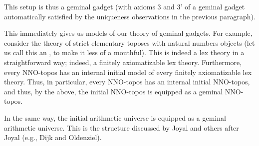 This setup is thus a geminal gadget (with axioms 3 and 3' of a geminal gadget automatically satisfied by the uniqueness observations in the previous paragraph).

This immediately gives us models of our theory of geminal gadgets. For example, consider the theory of strict elementary toposes with natural numbers objects (let us call this an , to make it less of a mouthful). This is indeed a lex theory in a straightforward way; indeed, a finitely axiomatizable lex theory. Furthermore, every NNO-topos has an internal initial model of every finitely axiomatizable lex theory. Thus, in particular, every NNO-topos has an internal initial NNO-topos, and thus, by the above, the initial NNO-topos is equipped as a geminal NNO-topos.


In the same way, the initial arithmetic universe is equipped as a geminal arithmetic universe. This is the structure discussed by Joyal and others after Joyal (e.g., Dijk and Oldenziel). 


